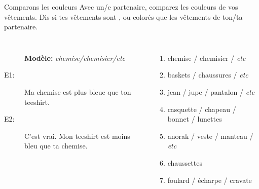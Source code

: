 \begin{frame}{Comparons les couleurs}
  Avec un/e partenaire, comparez les couleurs de vos vêtements.
  Dis si tes vêtements sont ,  ou  colorés que les vêtements de ton/ta partenaire.
  \begin{columns}
      \begin{description}
        \item[] \textbf{Modèle:} \emph{chemise/chemisier/etc}
        \item[E1:] Ma chemise est plus bleue que ton teeshirt.
        \item[] 
        \item[E2:] C'est vrai. Mon teeshirt est moins bleu que ta chemise.
        \item[] 
      \end{description}
      \begin{enumerate}
        \item chemise / chemisier / \emph{etc}
        \item baskets / chaussures / \emph{etc}
        \item jean / jupe / pantalon / \emph{etc}
        \item casquette / chapeau / bonnet / lunettes
        \item anorak / veste / manteau / \emph{etc}
        \item chaussettes
        \item foulard / écharpe / cravate
      \end{enumerate}
  \end{columns}
\end{frame}